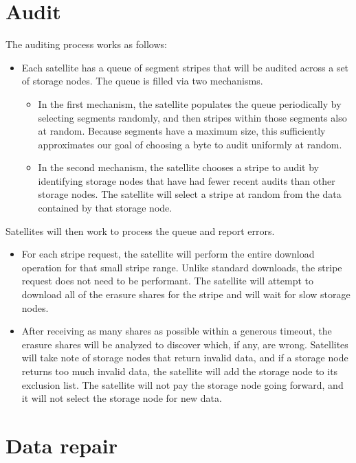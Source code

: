 \documentclass[11pt,fleqn,openany]{book}
\begin{document}
\section{Audit}

The auditing process works as follows:

\begin{itemize}
\item Each satellite has a queue of segment stripes that will be audited across
  a set of storage nodes. The queue is filled via two mechanisms.
  \begin{itemize}
  \item In the first mechanism, the satellite populates the queue periodically
    by selecting segments randomly, and then stripes within those segments also
    at random. Because segments have a maximum size, this sufficiently
    approximates our goal of choosing a byte to audit uniformly at random.
  \item In the second mechanism, the satellite chooses a stripe to audit by
    identifying storage nodes that have had fewer recent audits than other
    storage nodes. The satellite will select a stripe at random from the data
    contained by that storage node.
  \end{itemize}
\end{itemize}

Satellites will then work to process the queue and report errors.
\begin{itemize}
\item For each stripe request, the satellite will perform the entire download
  operation for that small stripe range. Unlike standard downloads, the stripe
  request does not need to be performant. The satellite will attempt to
  download all of the erasure shares for the stripe and will wait for slow
  storage nodes.
\item After receiving as many shares as possible within a generous timeout,
  the erasure shares will be analyzed to discover which, if any, are wrong.
  Satellites will take note of storage nodes that return invalid data, and if a
  storage node returns too much invalid data, the satellite will add the
  storage node to its exclusion list. The satellite will not pay the storage
  node going forward, and it will not select the storage node for new data.
\end{itemize}

\section{Data repair}
\end{document}
